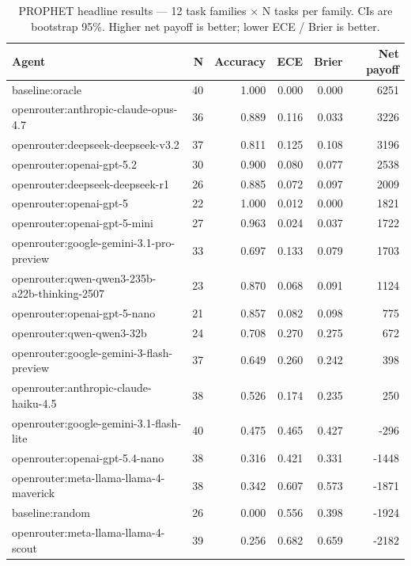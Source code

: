 \begin{table}[t]
\centering\small
\caption{PROPHET headline results --- 12 task families $\times$ N tasks per family. CIs are bootstrap 95\%. Higher net payoff is better; lower ECE / Brier is better.}\label{tab:headline}
\begin{tabular}{lrrrrr}
\toprule
Agent & N & Accuracy & ECE & Brier & Net payoff \\
\midrule
baseline:oracle & 40 & 1.000 & 0.000 & 0.000 & 6251 \\
openrouter:anthropic-claude-opus-4.7 & 36 & 0.889 & 0.116 & 0.033 & 3226 \\
openrouter:deepseek-deepseek-v3.2 & 37 & 0.811 & 0.125 & 0.108 & 3196 \\
openrouter:openai-gpt-5.2 & 30 & 0.900 & 0.080 & 0.077 & 2538 \\
openrouter:deepseek-deepseek-r1 & 26 & 0.885 & 0.072 & 0.097 & 2009 \\
openrouter:openai-gpt-5 & 22 & 1.000 & 0.012 & 0.000 & 1821 \\
openrouter:openai-gpt-5-mini & 27 & 0.963 & 0.024 & 0.037 & 1722 \\
openrouter:google-gemini-3.1-pro-preview & 33 & 0.697 & 0.133 & 0.079 & 1703 \\
openrouter:qwen-qwen3-235b-a22b-thinking-2507 & 23 & 0.870 & 0.068 & 0.091 & 1124 \\
openrouter:openai-gpt-5-nano & 21 & 0.857 & 0.082 & 0.098 & 775 \\
openrouter:qwen-qwen3-32b & 24 & 0.708 & 0.270 & 0.275 & 672 \\
openrouter:google-gemini-3-flash-preview & 37 & 0.649 & 0.260 & 0.242 & 398 \\
openrouter:anthropic-claude-haiku-4.5 & 38 & 0.526 & 0.174 & 0.235 & 250 \\
openrouter:google-gemini-3.1-flash-lite & 40 & 0.475 & 0.465 & 0.427 & -296 \\
openrouter:openai-gpt-5.4-nano & 38 & 0.316 & 0.421 & 0.331 & -1448 \\
openrouter:meta-llama-llama-4-maverick & 38 & 0.342 & 0.607 & 0.573 & -1871 \\
baseline:random & 26 & 0.000 & 0.556 & 0.398 & -1924 \\
openrouter:meta-llama-llama-4-scout & 39 & 0.256 & 0.682 & 0.659 & -2182 \\
\bottomrule
\end{tabular}
\end{table}